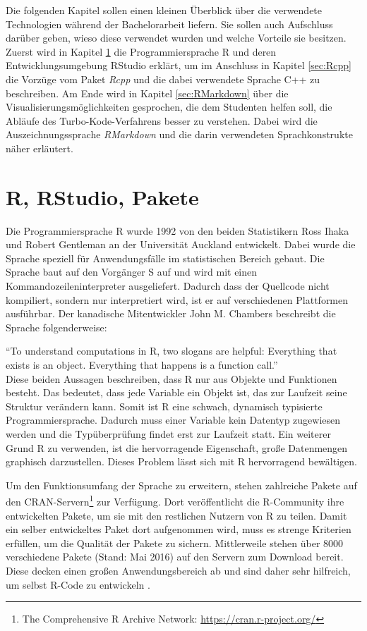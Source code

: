 Die folgenden Kapitel sollen einen kleinen Überblick über die verwendete Technologien während der Bachelorarbeit liefern. Sie sollen auch Aufschluss darüber geben, wieso diese verwendet wurden und welche Vorteile sie besitzen. Zuerst wird in Kapitel \ref{sec:R} die Programmiersprache R und deren Entwicklungsumgebung RStudio erklärt, um im Anschluss in Kapitel \ref{sec:Rcpp} die Vorzüge vom Paket \emph{Rcpp} und die dabei verwendete Sprache C++ zu beschreiben. Am Ende wird in Kapitel \ref{sec:RMarkdown} über die Visualisierungsmöglichkeiten gesprochen, die dem Studenten helfen soll, die Abläufe des Turbo-Kode-Verfahrens besser zu verstehen. Dabei wird die Auszeichnungssprache \emph{RMarkdown} und die darin verwendeten Sprachkonstrukte näher erläutert.

\section{R, RStudio, Pakete}
\label{sec:R}
Die Programmiersprache R wurde 1992 von den beiden Statistikern  Ross Ihaka und Robert Gentleman an der Universität Auckland entwickelt. Dabei wurde die Sprache speziell für Anwendungsfälle im statistischen Bereich gebaut. Die Sprache baut auf den Vorgänger S auf und wird mit einen Kommandozeileninterpreter ausgeliefert. Dadurch dass der Quellcode nicht kompiliert, sondern nur interpretiert wird, ist er auf verschiedenen Plattformen ausführbar. Der kanadische Mitentwickler John M. Chambers beschreibt die Sprache folgenderweise:

\enquote{To understand computations in R, two slogans are helpful: Everything that exists is an object. Everything that happens is a function call.} \cite{chambers2014object}\\

Diese beiden Aussagen beschreiben, dass R nur aus Objekte und Funktionen besteht. Das bedeutet, dass jede Variable ein Objekt ist, das zur Laufzeit seine Struktur verändern kann. Somit ist R eine schwach, dynamisch typisierte Programmiersprache. Dadurch muss einer Variable kein Datentyp zugewiesen werden und die Typüberprüfung findet erst zur Laufzeit statt. Ein weiterer Grund R zu verwenden, ist die hervorragende Eigenschaft, große Datenmengen graphisch darzustellen. Dieses Problem lässt sich mit R hervorragend bewältigen.

Um den Funktionsumfang der Sprache zu erweitern, stehen zahlreiche Pakete auf den CRAN-Servern\footnote{The Comprehensive R Archive Network: \url{https://cran.r-project.org/}} zur Verfügung. Dort veröffentlicht die R-Community ihre entwickelten Pakete, um sie mit den restlichen Nutzern von R zu teilen. Damit ein selber entwickeltes Paket dort aufgenommen wird, muss es strenge Kriterien erfüllen, um die Qualität der Pakete zu sichern. Mittlerweile stehen über 8000 verschiedene Pakete (Stand: Mai 2016) auf den Servern zum Download bereit. Diese decken einen großen Anwendungsbereich ab und sind daher sehr hilfreich, um selbst R-Code zu entwickeln \cite{rmanual}.

